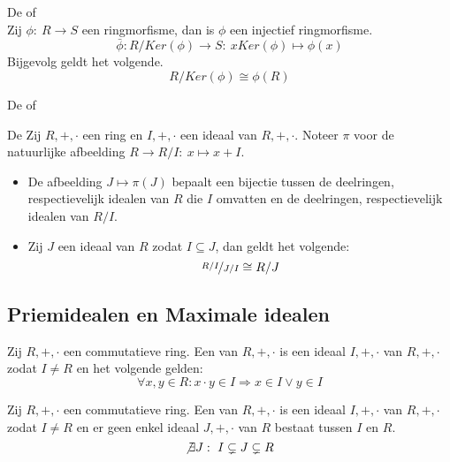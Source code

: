 \documentclass[main.tex]{subfiles}
\begin{document}
\begin{gev}
  De  of \\
  Zij $\phi:\ R \rightarrow S$ een ringmorfisme, dan is $\phi$ een injectief ringmorfisme.
  \[ \bar{\phi}: R/Ker(\phi) \rightarrow S:\ xKer(\phi) \mapsto \phi(x) \]
  Bijgevolg geldt het volgende.
  \[ R/Ker(\phi) \cong \phi(R) \]
\end{gev}

\begin{st}
  De  of 
\end{st}

\begin{st}
  De 
  Zij $R,+,\cdot$ een ring en $I,+,\cdot$ een ideaal van $R,+,\cdot$.
  Noteer $\pi$ voor de natuurlijke afbeelding $R \rightarrow R/I:\ x \mapsto x+I$.
  \begin{itemize}
  \item De afbeelding $J\mapsto \pi(J)$ bepaalt een bijectie tussen de deelringen, respectievelijk idealen van $R$ die $I$ omvatten en de deelringen, respectievelijk idealen van $R/I$.
  \item Zij $J$ een ideaal van $R$ zodat $I \subseteq J$, dan geldt het volgende:
    \[ \nicefrac{R/I}{J/I} \cong R/J \]
  \end{itemize}
\end{st}

\subsection{Priemidealen en Maximale idealen}
\label{sec:priem-en-maxim}

\begin{de}
  Zij $R,+,\cdot$ een commutatieve ring.
  Een  van $R,+,\cdot$ is een ideaal $I,+,\cdot$ van $R,+,\cdot$ zodat $I\neq R$ en het volgende gelden:
  \[ \forall x,y \in R: x \cdot y \in I \Rightarrow x \in I \vee y \in I \]
\end{de}

\begin{de}
  Zij $R,+,\cdot$ een commutatieve ring.
  Een  van $R,+,\cdot$ is een ideaal $I,+,\cdot$ van $R,+,\cdot$ zodat $I\neq R$ en er geen enkel ideaal $J,+,\cdot$ van $R$ bestaat tussen $I$ en $R$.
  \[ \not\exists J:\ I \subsetneq J \subsetneq R \]
\end{de}
\end{document}

